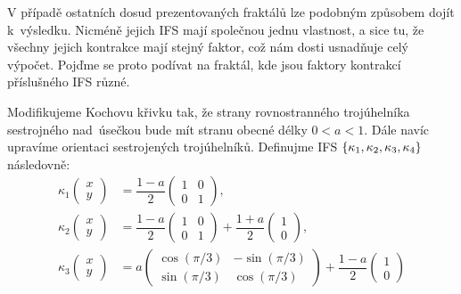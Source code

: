 V případě ostatních dosud prezentovaných fraktálů lze podobným způsobem dojít k~výsledku. Nicméně jejich IFS mají společnou jednu vlastnost, a sice tu, že všechny jejich kontrakce mají stejný faktor, což nám dosti usnadňuje celý výpočet. Pojďme se proto podívat na fraktál, kde jsou faktory kontrakcí příslušného IFS různé.
\begin{example}\label{ex:modifikovana-kochova-krivka}
    Modifikujeme Kochovu křivku tak, že strany rovnostranného trojúhelníka sestrojného nad~úsečkou bude mít stranu obecné délky $0<a<1$. Dále navíc upravíme orientaci sestrojených trojúhelníků. Definujme IFS $\left\{\kappa_1,\kappa_2,\kappa_3,\kappa_4\right\}$ následovně:
    \begin{align*}
        \kappa_1\left(\begin{matrix}
            x\\
            y
        \end{matrix}\right)&=\dfrac{1-a}{2}\left(\begin{matrix}
            1 & 0\\
            0 & 1
        \end{matrix}\right),\\
        \kappa_2\left(\begin{matrix}
            x\\
            y
        \end{matrix}\right)&=\dfrac{1-a}{2}\left(\begin{matrix}
            1 & 0\\
            0 & 1
        \end{matrix}\right)+\dfrac{1+a}{2}\left(\begin{matrix}
            1\\
            0
        \end{matrix}\right),\\
        \kappa_3\left(\begin{matrix}
            x\\
            y
        \end{matrix}\right)&=a\left(\begin{matrix}
            \cos(\pi/3) & -\sin(\pi/3)\\
            \sin(\pi/3) & \cos(\pi/3)
        \end{matrix}\right)+\dfrac{1-a}{2}\left(\begin{matrix}
            1\\
            0
        \end{matrix}\right)\\

\end{align*}
\end{example}

